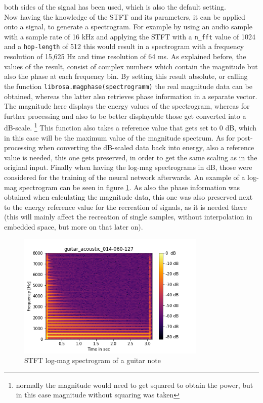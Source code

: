 both sides of the signal has been used, which is also the default setting. \\

Now having the knowledge of the STFT and its parameters, it can be applied onto a signal, to generate a spectrogram. For example by using an audio sample with a sample rate of 16 kHz and applying the STFT with a \texttt{n\_fft} value of 1024 and a \texttt{hop-length} of 512 this would result in a spectrogram with a frequency resolution of 15,625 Hz and time resolution of 64 ms. As explained before, the values of the result, consist of complex numbers which contain the magnitude but also the phase at each frequency bin. By setting this result absolute, or calling the function \texttt{librosa.magphase(spectrogramm)} the real magnitude data can be obtained, whereas the latter also retrieves phase information in a separate vector. The magnitude here displays the energy values of the spectrogram, whereas for further processing and also to be better displayable those get converted into a dB-scale. \footnote{normally the magnitude would need to get squared to obtain the power, but in this case magnitude without squaring was taken} This function also takes a reference value that gets set to 0 dB, which in this case will be the maximum value of the magnitude spectrum. As for post-processing when converting the dB-scaled data back into energy, also a reference value is needed, this one gets preserved, in order to get the same scaling as in the original input. Finally when having the log-mag spectrograms in dB, those were considered for the training of the neural network afterwards. An example of a log-mag spectrogram can be seen in figure \ref{fig:spectrogram}. As also the phase information was obtained when calculating the magnitude data, this one was also preserved next to the energy reference value for the recreation of signals, as it is needed there (this will mainly affect the recreation of single samples, without interpolation in embedded space, but more on that later on).


 \begin{figure}[htb!]
	\caption{STFT log-mag spectrogram of a guitar note}
	\label{fig:spectrogram}
	\centering
	\includegraphics[width=0.8\textwidth]{images/approach/guitar_acoustic_014-060-127.png}
\end{figure}

